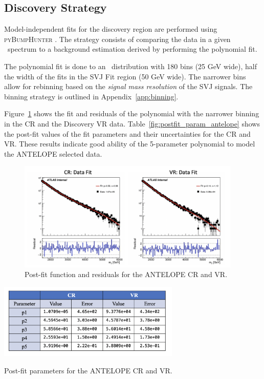 \subsection{Discovery Strategy}
\label{subsec:fit_bh}

Model-independent fits for the discovery region are performed using \textsc{pyBumpHunter} \cite{bumphunt}.
The strategy consists of comparing the data in a given \mt~spectrum to a background estimation derived by performing the polynomial fit.

The polynomial fit is done to an \mt~distribution with 180 bins (25 GeV wide), half the width of the fits in the SVJ Fit region (50 GeV wide). %
The narrower bins allow for rebinning based on the \textit{signal mass resolution} of the SVJ signals.
The binning strategy is outlined in Appendix~\ref{app:binning}.

Figure~\ref{fig:bkgfit_data_crvr_antelope} shows the fit and residuals of the polynomial with the narrower binning in the CR and the Discovery VR data.
Table~\ref{fig:postfit_param_antelope} shows the post-fit values of the fit parameters and their uncertainties for the CR and VR. 
These results indicate good ability of the 5-parameter polynomial to model the ANTELOPE selected data.

\begin{figure}[!htbp]
\centering
   \includegraphics[width=0.95\textwidth]{figures/stats/bkgfit_data_crvr_antelope}
    \caption{Post-fit function and residuals for the ANTELOPE CR and VR.
    \label{fig:bkgfit_data_crvr_antelope}}
\end{figure}

\begin{table}[!htbp]
\centering
   \includegraphics[width=0.65\textwidth]{figures/stats/postfit_param_antelope}
    \caption{Post-fit parameters for the ANTELOPE CR and VR.
    \label{fig:postfit_param_antelope}}
\end{table}

